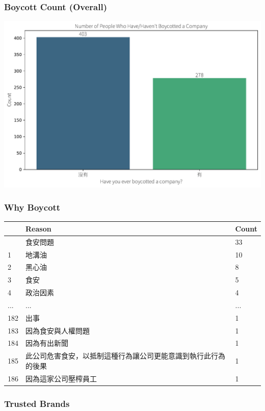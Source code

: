 \documentclass[
  letterpaper,
  DIV=11,
  numbers=noendperiod]{scrartcl}
\begin{document}
\subsubsection{Boycott Count (Overall)}\label{boycott-count-overall}

\includegraphics{_thesis_files/figure-pdf/cell-66-output-1.pdf}

\subsubsection{Why Boycott}\label{why-boycott}

\begin{longtable}[]{@{}lll@{}}
\toprule\noalign{}
& Reason & Count \\
\midrule\noalign{}
\endhead
\bottomrule\noalign{}
\endlastfoot
0 & 食安問題 & 33 \\
1 & 地溝油 & 10 \\
2 & 黑心油 & 8 \\
3 & 食安 & 5 \\
4 & 政治因素 & 4 \\
... & ... & ... \\
182 & 出事 & 1 \\
183 & 因為食安與人權問題 & 1 \\
184 & 因為有出新聞 & 1 \\
185 & 此公司危害食安，以抵制這種行為讓公司更能意識到執行此行為的後果 &
1 \\
186 & 因為這家公司壓榨員工 & 1 \\
\end{longtable}

\subsubsection{Trusted Brands}\label{trusted-brands}
\end{document}
